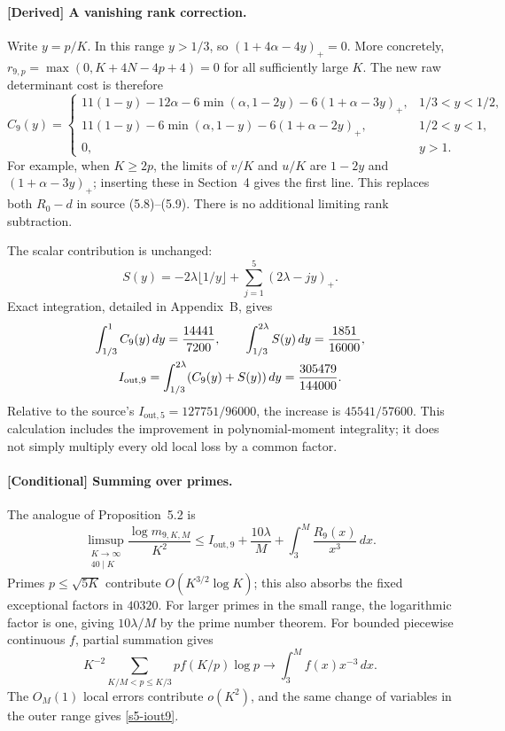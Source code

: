 \paragraph{[Derived] A vanishing rank correction.}
Write $y=p/K$.  In this range $y>1/3$, so
$(1+4\alpha-4y)_+=0$.  More concretely,
$r_{9,p}=\max(0,K+4N-4p+4)=0$ for all sufficiently large $K$.
The new raw determinant cost is therefore
\begin{equation}
 C_9(y)=
 \begin{cases}
 11(1-y)-12\alpha-6\min(\alpha,1-2y)
       -6(1+\alpha-3y)_+,&1/3<y<1/2,\\
 11(1-y)-6\min(\alpha,1-y)
       -6(1+\alpha-2y)_+,&1/2<y<1,\\
 0,&y>1.
 \end{cases}
 \label{s5-c9}
\end{equation}
For example, when $K\geq2p$, the limits of $v/K$ and $u/K$ are
$1-2y$ and $(1+\alpha-3y)_+$; inserting these in Section~4 gives
the first line.  This replaces both $R_0-d$ in source (5.8)--(5.9).
There is no additional limiting rank subtraction.

The scalar contribution is unchanged:
\[
 S(y)=-2\lambda\lfloor1/y\rfloor+
              \sum_{j=1}^{5}(2\lambda-jy)_+.
\]
Exact integration, detailed in Appendix~B, gives
\begin{gather}
 \int_{1/3}^{1}C_9(y)\,dy=\frac{14441}{7200},\qquad
 \int_{1/3}^{2\lambda}S(y)\,dy=\frac{1851}{16000},\notag\\
 I_{\mathrm{out},9}=\int_{1/3}^{2\lambda}(C_9(y)+S(y))\,dy
                   =\frac{305479}{144000}.
 \label{s5-iout9}
\end{gather}
Relative to the source's $I_{\mathrm{out},5}=127751/96000$, the
increase is $45541/57600$.  This calculation includes the improvement
in polynomial-moment integrality; it does not simply multiply every
old local loss by a common factor.

\paragraph{[Conditional] Summing over primes.}
The analogue of Proposition~5.2 is
\begin{equation}
 \limsup_{\substack{K\to\infty\\40\mid K}}
 \frac{\log m_{9,K,M}}{K^2}
 \leq I_{\mathrm{out},9}+\frac{10\lambda}{M}
                    +\int_3^M\frac{R_9(x)}{x^3}\,dx.
 \label{s5-prime-sum}
\end{equation}
Primes $p\leq\sqrt{5K}$ contribute $O(K^{3/2}\log K)$; this also
absorbs the fixed exceptional factors in $40320$.  For larger primes
in the small range, the logarithmic factor is one, giving
$10\lambda/M$ by the prime number theorem.  For bounded piecewise
continuous $f$, partial summation gives
\[
 K^{-2}\sum_{K/M<p\leq K/3}p f(K/p)\log p
       \longrightarrow\int_3^M f(x)x^{-3}\,dx.
\]
The $O_M(1)$ local errors contribute $o(K^2)$, and the same change of
variables in the outer range gives \eqref{s5-iout9}.

